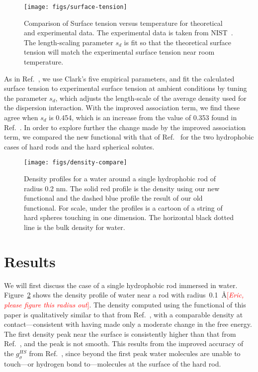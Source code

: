 \documentclass[twocolumn,amsmath,amssymb,prl]{revtex4-1}
\newcommand\lscale{\ensuremath{s_d}}
\newcommand{\fixme}[1]{\textcolor{red}{[\emph{#1}]}}
\begin{document}
\begin{figure}
\begin{center}
\texttt{[image: figs/surface-tension]}
\end{center}
\caption{Comparison of Surface tension versus temperature for
  theoretical and experimental data. The experimental data is taken
  from NIST~\cite{nistwater}.  The length-scaling parameter $\lscale$
  is fit so that the theoretical surface tension will match the
  experimental surface tension near room temperature.}
\label{fig:surface-tension}
\end{figure}

As in Ref.~, we use Clark's five
empirical parameters, and fit the calculated surface tension to
experimental surface tension at ambient conditions by tuning the
parameter $\lscale$, which adjusts the length-scale of the average
density used for the dispersion interaction.  With the improved
association term, we find these agree when $\lscale$ is 0.454, which
is an increase from the value of 0.353 found in
Ref.~.  In order to explore further the
change made by the improved association term, we compared the new
functional with that of Ref.~ for the two
hydrophobic cases of hard rods and the hard spherical solutes.

\begin{figure}
\begin{center}
\texttt{[image: figs/density-compare]}
\end{center}
\caption{ Density profiles for a water around a single hydrophobic
  rod of radius 0.2 nm. The solid red profile is the density using our new functional
  and the dashed blue profile the result of our old functional.  For
  scale, under the profiles is a cartoon of a string of hard
  spheres touching in one dimension. The horizontal black dotted line
  is the bulk density for water.}
\label{fig:density-single-rod}
\end{figure}

\section{Results}

We will first discuss the case of a single hydrophobic rod immersed in
water. Figure~\ref{fig:density-single-rod} shows the density profile
of water near a rod with radius~0.1~\AA\fixme{Eric, please figure this
  radius out}.  The density computed using the functional of this
paper is qualitatively similar to that from
Ref.~, with a comparable density at
contact---consistent with having made only a moderate change in the
free energy.  The first density peak near the surface is consistently
higher than that from Ref.~, and the peak
is not smooth.  This results from the improved accuracy of the
$g_\sigma^\textit{HS}$ from Ref.~, since beyond the
first peak water molecules are unable to touch---or hydrogen bond
to---molecules at the surface of the hard rod.
\end{document}

